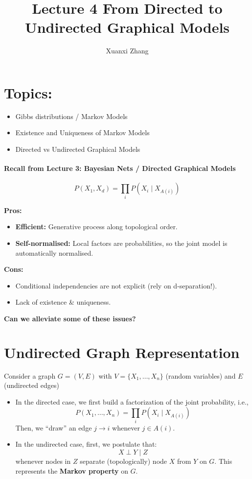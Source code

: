 \documentclass{article}%
\title{\huge Lecture 4 From Directed to Undirected Graphical Models\\
\normalsize}
\author{Xuanxi Zhang}
\begin{document}
\maketitle


\section*{Topics:}
\begin{itemize}
    \item Gibbs distributions / Markov Models
    \item Existence and Uniqueness of Markov Models
    \item Directed vs Undirected Graphical Models
\end{itemize}

\paragraph{Recall from Lecture 3: Bayesian Nets / Directed Graphical Models}
\[
P(X_1, X_d) = \prod_i P(X_i \mid X_{A(i)})
\]

\textbf{Pros:}
\begin{itemize}
    \item \textbf{Efficient:} Generative process along topological order.
    \item \textbf{Self-normalised:} Local factors are probabilities, so the joint model is automatically normalised.
\end{itemize}

\textbf{Cons:}
\begin{itemize}
    \item Conditional independencies are not explicit (rely on d-separation!).
    \item Lack of existence \& uniqueness.
\end{itemize}

\textbf{
Can we alleviate some of these issues?}

\section{Undirected Graph Representation}

Consider a graph \( G = (V, E) \) with \( V = \{X_1, \dots, X_n\} \) (random variables) and  \( E \) (undirected edges)

\begin{itemize}
    \item In the directed case, we first build a factorization of the joint probability, i.e., 
    \[
    P(X_1, \dots, X_n) = \prod_i P(X_i \mid X_{A(i)})
    \]
    Then, we ``draw'' an edge \( j \to i \) whenever \( j \in A(i) \).
    \item In the undirected case, first, we postulate that:
    \[
    X \perp Y \mid Z
    \]
    whenever nodes in \( Z \) separate (topologically) node \( X \) from \( Y \) on \( G \). This represents the \textbf{Markov property} on \( G \).
    
\end{itemize}
\end{document}
